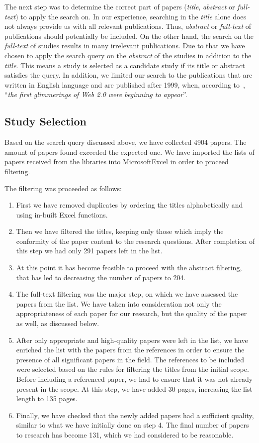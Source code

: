 \documentclass[PhD, Submit, ngerman,UKenglish,table]{scrbook}
\begin{document}
The next step was to determine the correct part of papers (\emph{title}, \emph{abstract} or \emph{full-text}) to apply the search on.
In our experience, searching in the \emph{title} alone does not always provide us with all relevant publications.
Thus, \emph{abstract} or \emph{full-text} of publications should potentially be included.
On the other hand, the search on the \emph{full-text} of studies results in many irrelevant publications.
Due to that we have chosen to apply the search query on the \emph{abstract} of the studies in addition to the \emph{title}.  
This means a study is selected as a candidate study if its title or abstract satisfies the query.
In addition, we limited our search to the publications that are written in English language and are published after 1999, when, according to~\cite{dinucci1999design}, ``\emph{the first glimmerings of Web 2.0 were beginning to appear}''.


\subsection{Study Selection}
\label{sec:studySelection}

Based on the search query discussed above, we have collected 4904 papers.
The amount of papers found exceeded the expected one.
We have imported the lists of papers received from the libraries into MicrosoftExcel in order to proceed filtering.

The filtering was proceeded as follows:
\begin{enumerate}
\item First we have removed duplicates by ordering the titles alphabetically and using in-built Excel functions.
\item Then we have filtered the titles, keeping only those which imply the conformity of the paper content to the research questions. After completion of this step we had only 291 papers left in the list.
\item At this point it has become feasible to proceed with the abstract filtering, that has led to decreasing the number of papers to 204.
\item The full-text filtering was the major step, on which we have assessed the papers from the list. We have taken into consideration not only the appropriateness of each paper for our research, but the quality of the paper as well, as discussed below.
\item After only appropriate and high-quality papers were left in the list, we have enriched the list with the papers from the references in order to ensure the presence of all significant papers in the field. 
The references to be included were selected based on the rules for filtering the titles from the initial scope.
Before including a referenced paper, we had to ensure that it was not already present in the scope.
At this step, we have added 30 pages, increasing the list length to 135 pages.
\item Finally, we have checked that the newly added papers had a sufficient quality, similar to what we have initially done on step 4.
The final number of papers to research has become 131, which we had considered to be reasonable.
\end{enumerate}
\end{document}
